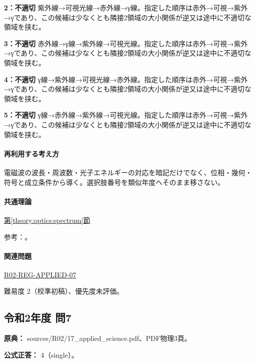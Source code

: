 \noindent\textbf{2：不適切} 紫外線→可視光線→赤外線→γ線。指定した順序は赤外→可視→紫外→γであり、この候補は少なくとも隣接2領域の大小関係が逆又は途中に不適切な領域を挟む。\par

\noindent\textbf{3：不適切} 赤外線→γ線→紫外線→可視光線。指定した順序は赤外→可視→紫外→γであり、この候補は少なくとも隣接2領域の大小関係が逆又は途中に不適切な領域を挟む。\par

\noindent\textbf{4：不適切} γ線→紫外線→可視光線→赤外線。指定した順序は赤外→可視→紫外→γであり、この候補は少なくとも隣接2領域の大小関係が逆又は途中に不適切な領域を挟む。\par

\noindent\textbf{5：不適切} γ線→赤外線→紫外線→可視光線。指定した順序は赤外→可視→紫外→γであり、この候補は少なくとも隣接2領域の大小関係が逆又は途中に不適切な領域を挟む。\par

\paragraph{再利用する考え方} 電磁波の波長・周波数・光子エネルギーの対応を暗記だけでなく、位相・幾何・符号と成立条件から導く。選択肢番号を類似年度へそのまま移さない。

\paragraph{共通理論} \hyperref[theory:optics:spectrum]{第\ref*{theory:optics:spectrum}節}

\par 参考：\cite{os_spectrum}。

\paragraph{関連問題} \hyperref[q:r02-reg-applied-07]{R02-REG-APPLIED-07}

\par 難易度 2（校準初稿）、優先度未評価。

\subsection{令和2年度 問7}
\label{q:r02-reg-applied-07}

\noindent\textbf{原典：} sources/R02/17\_applied\_science.pdf、PDF物理3頁。

\textbf{公式正答：} 4（single）。

